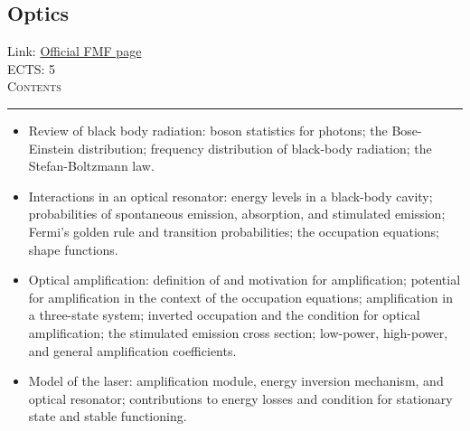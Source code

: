 \documentclass[11pt, a4paper]{article}
\newenvironment{course}[3]{
\subsection{#1}%
Link: \href{#2}{Official FMF page}\\%
ECTS: #3%
\vspace{1ex}
\\
{\large \textsc{Contents}}\\[-0.9ex]%
\rule{\textwidth}{0.5pt}
\vspace{-3ex}
}
{}
\newenvironment{chapter}[1]{
\begin{tcolorbox}[title=#1, breakable]
}
{\end{tcolorbox}}
\begin{document}
\begin{course}{Optics}{https://www.fmf.uni-lj.si/en/study-physics/programmes/1fiz/2020/7000777/courses/1165/}{5}
\begin{chapter}{Introduction to lasers}
\begin{itemize}
            \item Review of black body radiation: boson statistics for photons; the Bose-Einstein distribution; frequency distribution of black-body radiation; the Stefan-Boltzmann law.

            \item Interactions in an optical resonator: energy levels in a black-body cavity; probabilities of spontaneous emission, absorption, and stimulated emission; Fermi's golden rule and transition probabilities; the occupation equations; shape functions.

            \item Optical amplification: definition of and motivation for amplification; potential for amplification in the context of the occupation equations; amplification in a three-state system; inverted occupation and the condition for optical amplification; the stimulated emission cross section; low-power, high-power, and general amplification coefficients.

            \item Model of the laser: amplification module, energy inversion mechanism, and optical resonator; contributions to energy losses and condition for stationary state and stable functioning.
        
        \end{itemize}
    \end{chapter}
\end{course}
\end{document}
